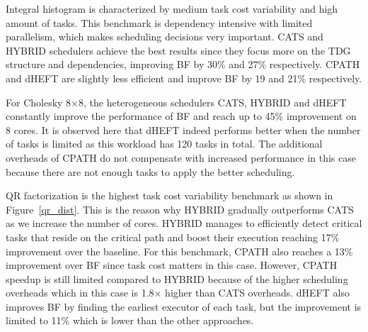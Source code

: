 
Integral histogram is characterized by medium task cost variability and high amount of tasks.
This benchmark is dependency intensive with limited parallelism, which makes scheduling decisions very important.
CATS and HYBRID schedulers achieve the best results since they focus more on the TDG structure and dependencies, improving BF by 30\% and 27\% respectively.
CPATH and dHEFT are slightly less efficient and improve BF by 19 and 21\% respectively.


For Cholesky 8$\times$8, the heterogeneous schedulers CATS, HYBRID and dHEFT constantly improve the performance of BF and reach up to 45\% improvement on 8 cores.
It is observed here that dHEFT indeed performs better when the number of tasks is limited as this workload has 120 tasks in total.
The additional overheads of CPATH do not compensate with increased performance in this case because there are not enough tasks to apply the better scheduling.


QR factorization is the highest task cost variability benchmark as shown in Figure~\ref{qr_dist}.
This is the reason why HYBRID gradually outperforms CATS as we increase the number of cores.
HYBRID manages to efficiently detect critical tasks that reside on the critical path and boost their execution reaching 17\% improvement over the baseline.
For this benchmark, CPATH also reaches a 13\% improvement over BF since task cost matters in this case. 
However, CPATH speedup is still limited compared to HYBRID because of the higher scheduling overheads which in this case is 1.8$\times$ higher than CATS overheads.
dHEFT also improves BF by finding the earliest executor of each task, but the improvement is limited to 11\% which is lower than the other approaches.


